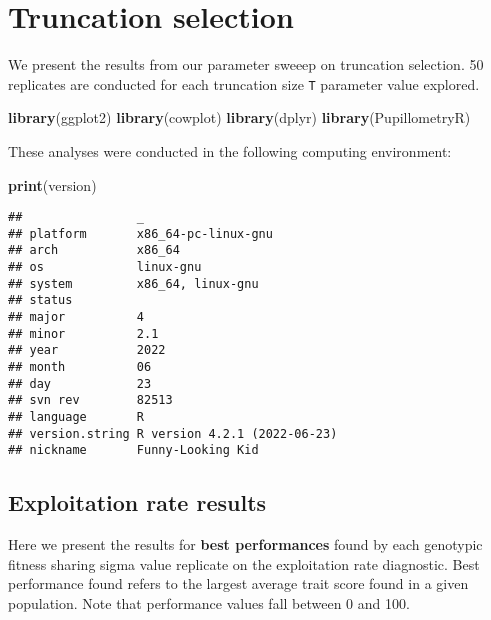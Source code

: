 \documentclass[]{book}
\newenvironment{Shaded}{\begin{snugshade}}{\end{snugshade}}
\newcommand{\KeywordTok}[1]{\textcolor[rgb]{0.13,0.29,0.53}{\textbf{#1}}}
\newcommand{\NormalTok}[1]{#1}
\begin{document}
\hypertarget{truncation-selection}{%
\chapter{Truncation selection}\label{truncation-selection}}

We present the results from our parameter sweeep on truncation selection.
50 replicates are conducted for each truncation size \texttt{T} parameter value explored.

\begin{Shaded}
\begin{Highlighting}[]
\KeywordTok{library}\NormalTok{(ggplot2)}
\KeywordTok{library}\NormalTok{(cowplot)}
\KeywordTok{library}\NormalTok{(dplyr)}
\KeywordTok{library}\NormalTok{(PupillometryR)}
\end{Highlighting}
\end{Shaded}

These analyses were conducted in the following computing environment:

\begin{Shaded}
\begin{Highlighting}[]
\KeywordTok{print}\NormalTok{(version)}
\end{Highlighting}
\end{Shaded}

\begin{verbatim}
##                _                           
## platform       x86_64-pc-linux-gnu         
## arch           x86_64                      
## os             linux-gnu                   
## system         x86_64, linux-gnu           
## status                                     
## major          4                           
## minor          2.1                         
## year           2022                        
## month          06                          
## day            23                          
## svn rev        82513                       
## language       R                           
## version.string R version 4.2.1 (2022-06-23)
## nickname       Funny-Looking Kid
\end{verbatim}

\hypertarget{exploitation-rate-results-1}{%
\section{Exploitation rate results}\label{exploitation-rate-results-1}}

Here we present the results for \textbf{best performances} found by each genotypic fitness sharing sigma value replicate on the exploitation rate diagnostic.
Best performance found refers to the largest average trait score found in a given population.
Note that performance values fall between 0 and 100.
\end{document}
